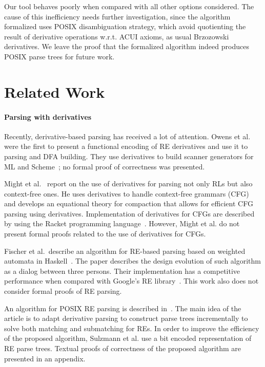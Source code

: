 \documentclass[sigplan, anonymous, review]{acmart}
\theoremstyle{definition}
\begin{document}
Our tool behaves poorly when compared with all other options
considered. The cause of this inefficiency needs further
investigation, since the algorithm formalized uses POSIX 
disambiguation strategy, which avoid quotienting the result of derivative
operations w.r.t. ACUI axioms, as usual Brzozowski derivatives. We leave 
the proof that the formalized algorithm indeed produces POSIX parse trees 
for future work.

\section{Related Work}\label{sec:related}

\paragraph{Parsing with derivatives} Recently, derivative-based
parsing has received a lot of attention. Owens et al. were the first
to present a functional encoding of RE derivatives and use it to
parsing and DFA building. They use derivatives to build scanner
generators for ML and Scheme~\cite{Owens2009}; no formal proof of
correctness was presented.

Might et al.~\cite{Might2011} report on
the use of derivatives for parsing not only RLs but also context-free
ones. He uses derivatives to handle context-free grammars (CFG) and
develops an equational theory for compaction that allows for efficient
CFG parsing using derivatives. Implementation of derivatives for CFGs
are described by using the Racket programming
language~\cite{Felleisen2013}. However, Might et al. do not present
formal proofs related to the use of derivatives for CFGs.

Fischer et al.~describe an algorithm for RE-based parsing based on
weighted automata in Haskell~\cite{Fischer2010}.  The paper describes
the design evolution of such algorithm as a dialog between three
persons. Their implementation has a competitive performance when
compared with Google's RE library~\cite{re2}. This work also does not
consider formal proofs of RE parsing.

An algorithm for POSIX RE parsing is described
in~\cite{SulzmannL14}. The main idea of the article is to adapt
derivative parsing to construct parse trees incrementally to solve
both matching and submatching for REs. In order to improve the
efficiency of the proposed algorithm, Sulzmann et al. use a bit
encoded representation of RE parse trees. Textual proofs of
correctness of the proposed algorithm are presented in an appendix.
\end{document}
